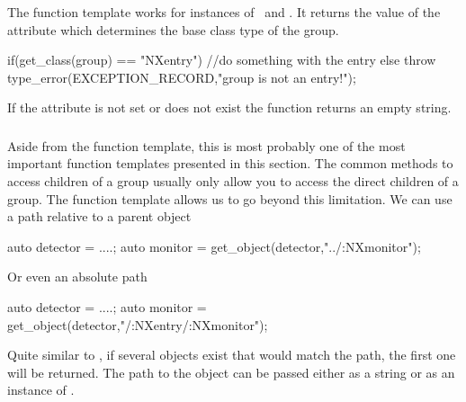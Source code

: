 \subsubsection{}


\subsubsection{}

The  function template works for instances of \nxgroup\ and
\nxobject. It returns the value of the  attribute which 
determines the base class type of the group.
\begin{cppcode}
if(get_class(group) == "NXentry")
    //do something with the entry
else
    throw type_error(EXCEPTION_RECORD,"group is not an entry!");
\end{cppcode}
If the attribute is not set or does not exist the function returns an empty
string. 

\subsubsection{}

Aside from the  function template, this is most probably one of
the most important function templates presented in this section. 
The common methods to access children of a group usually only allow you to 
access the direct children of a group. The  function template 
allows us to go beyond this limitation. 
We can use a path relative to a parent object
\begin{cppcode}
auto detector = ....;
auto monitor  = get_object(detector,"../:NXmonitor");
\end{cppcode}
Or even an absolute path
\begin{cppcode}
auto detector = ....;
auto monitor  = get_object(detector,"/:NXentry/:NXmonitor");
\end{cppcode}
Quite similar to , if several objects exist that would match
the path, the first one will be returned. The path to the object can be passed 
either as a string or as an instance of \nxpath.

